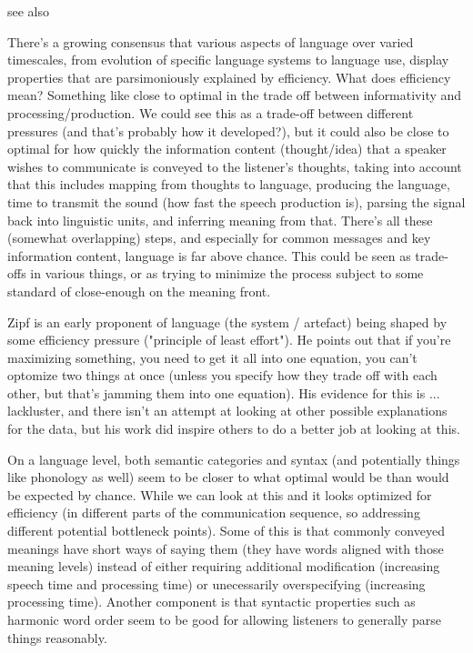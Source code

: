 \documentclass[]{article}
\begin{document}
see also \cite{zipf1949}


There's a growing consensus that various aspects of language over varied timescales, from evolution of specific language systems to language use, display properties that are parsimoniously explained by efficiency. What does efficiency mean? Something like close to optimal in the trade off between informativity and processing/production. We could see this as a trade-off between different pressures (and that's probably how it developed?), but it could also be close to optimal for how quickly the information content (thought/idea) that a speaker wishes to communicate is conveyed to the listener's thoughts, taking into account that this includes mapping from thoughts to language, producing the language, time to transmit the sound (how fast the speech production is), parsing the signal back into linguistic units, and inferring meaning from that. There's all these (somewhat overlapping) steps, and especially for common messages and key information content, language is far above chance. This could be seen as trade-offs in various things, or as trying to minimize the process subject to some standard of close-enough on the meaning front. 

Zipf is an early proponent of language (the system / artefact) being shaped by some efficiency pressure ("principle of least effort"). He points out that if you're maximizing something, you need to get it all into one equation, you can't optomize two things at once (unless you specify how they trade off with each other, but that's jamming them into one equation). His evidence for this is ... lackluster, and there isn't an attempt at looking at other possible explanations for the data, but his work did inspire others to do a better job at looking at this. 

On a language level, both semantic categories and syntax (and potentially things like phonology as well) seem to be closer to what optimal would be than would be expected by chance. While we can look at this and it looks optimized for efficiency (in different parts of the communication sequence, so addressing different potential bottleneck points). Some of this is that commonly conveyed meanings have short ways of saying them (they have words aligned with those meaning levels) instead of either requiring additional modification (increasing speech time and processing time) or unecessarily overspecifying (increasing processing time). Another component is that syntactic properties such as harmonic word order seem to be good for allowing listeners to generally parse things reasonably. 
\end{document}

